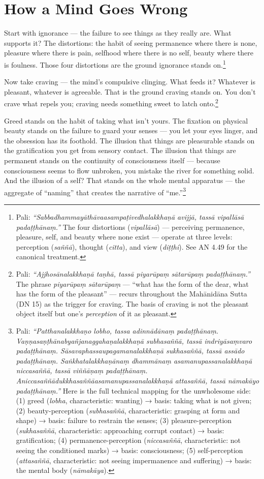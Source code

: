 \section*{How a Mind Goes Wrong}

Start with ignorance --- the failure to see things as they really are. What supports it? The distortions: the habit of seeing permanence where there is none, pleasure where there is pain, selfhood where there is no self, beauty where there is foulness. Those four distortions are the ground ignorance stands on.\footnote{Pali: \textit{``Sabbadhammayāthāvaasampaṭivedhalakkhaṇā avijjā, tassā vipallāsā padaṭṭhānaṃ.''} The four distortions (\textit{vipallāsā}) --- perceiving permanence, pleasure, self, and beauty where none exist --- operate at three levels: perception (\textit{saññā}), thought (\textit{citta}), and view (\textit{diṭṭhi}). See AN 4.49 for the canonical treatment.}

Now take craving --- the mind's compulsive clinging. What feeds it? Whatever is pleasant, whatever is agreeable. That is the ground craving stands on. You don't crave what repels you; craving needs something sweet to latch onto.\footnote{Pali: \textit{``Ajjhosānalakkhaṇā taṇhā, tassā piyarūpaṃ sātarūpaṃ padaṭṭhānaṃ.''} The phrase \textit{piyarūpaṃ sātarūpaṃ} --- ``what has the form of the dear, what has the form of the pleasant'' --- recurs throughout the Mahānidāna Sutta (DN 15) as the trigger for craving. The basis of craving is not the pleasant object itself but one's \textit{perception} of it as pleasant.}

Greed stands on the habit of taking what isn't yours. The fixation on physical beauty stands on the failure to guard your senses --- you let your eyes linger, and the obsession has its foothold. The illusion that things are pleasurable stands on the gratification you get from sensory contact. The illusion that things are permanent stands on the continuity of consciousness itself --- because consciousness seems to flow unbroken, you mistake the river for something solid. And the illusion of a self? That stands on the whole mental apparatus --- the aggregate of ``naming'' that creates the narrative of ``me.''\footnote{Pali: \textit{``Patthanalakkhaṇo lobho, tassa adinnādānaṃ padaṭṭhānaṃ. Vaṇṇasaṇṭhānabyañjanaggahaṇalakkhaṇā subhasaññā, tassā indriyāsaṃvaro padaṭṭhānaṃ. Sāsavaphassaupagamanalakkhaṇā sukhasaññā, tassā assādo padaṭṭhānaṃ. Saṅkhatalakkhaṇānaṃ dhammānaṃ asamanupassanalakkhaṇā niccasaññā, tassā viññāṇaṃ padaṭṭhānaṃ. Aniccasaññādukkhasaññāasamanupassanalakkhaṇā attasaññā, tassā nāmakāyo padaṭṭhānaṃ.''} Here is the full technical mapping for the unwholesome side: (1) greed (\textit{lobha}, characteristic: wanting) → basis: taking what is not given; (2) beauty-perception (\textit{subhasaññā}, characteristic: grasping at form and shape) → basis: failure to restrain the senses; (3) pleasure-perception (\textit{sukhasaññā}, characteristic: approaching corrupt contact) → basis: gratification; (4) permanence-perception (\textit{niccasaññā}, characteristic: not seeing the conditioned marks) → basis: consciousness; (5) self-perception (\textit{attasaññā}, characteristic: not seeing impermanence and suffering) → basis: the mental body (\textit{nāmakāya}).}

